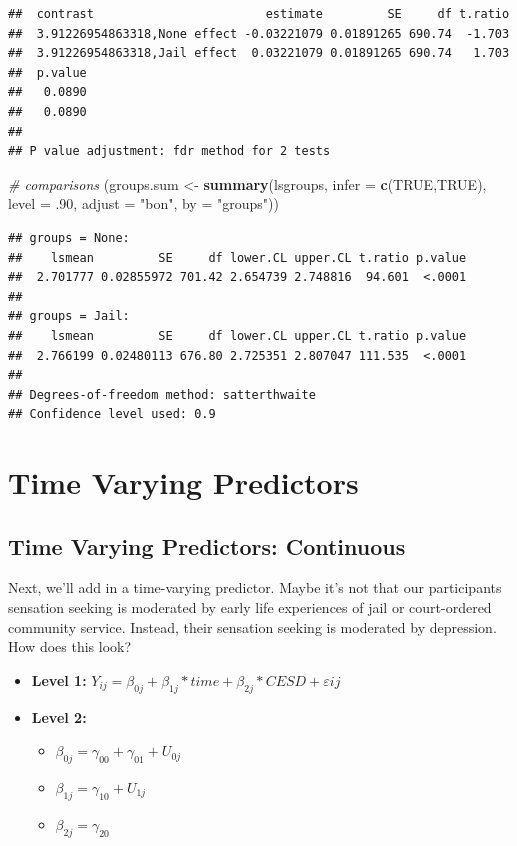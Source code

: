 \documentclass[]{article}
\newenvironment{Shaded}{\begin{snugshade}}{\end{snugshade}}
\newcommand{\KeywordTok}[1]{\textcolor[rgb]{0.13,0.29,0.53}{\textbf{{#1}}}}
\newcommand{\DataTypeTok}[1]{\textcolor[rgb]{0.13,0.29,0.53}{{#1}}}
\newcommand{\DecValTok}[1]{\textcolor[rgb]{0.00,0.00,0.81}{{#1}}}
\newcommand{\StringTok}[1]{\textcolor[rgb]{0.31,0.60,0.02}{{#1}}}
\newcommand{\CommentTok}[1]{\textcolor[rgb]{0.56,0.35,0.01}{\textit{{#1}}}}
\newcommand{\OtherTok}[1]{\textcolor[rgb]{0.56,0.35,0.01}{{#1}}}
\newcommand{\NormalTok}[1]{{#1}}
\begin{document}
\begin{verbatim}
##  contrast                        estimate         SE     df t.ratio
##  3.91226954863318,None effect -0.03221079 0.01891265 690.74  -1.703
##  3.91226954863318,Jail effect  0.03221079 0.01891265 690.74   1.703
##  p.value
##   0.0890
##   0.0890
## 
## P value adjustment: fdr method for 2 tests
\end{verbatim}

\begin{Shaded}
\begin{Highlighting}[]
\CommentTok{# comparisons}
\NormalTok{(groups.sum <-}\StringTok{ }\KeywordTok{summary}\NormalTok{(lsgroups, }\DataTypeTok{infer =} \KeywordTok{c}\NormalTok{(}\OtherTok{TRUE}\NormalTok{,}\OtherTok{TRUE}\NormalTok{), }
          \DataTypeTok{level =} \NormalTok{.}\DecValTok{90}\NormalTok{, }\DataTypeTok{adjust =} \StringTok{"bon"}\NormalTok{, }\DataTypeTok{by =} \StringTok{"groups"}\NormalTok{))}
\end{Highlighting}
\end{Shaded}

\begin{verbatim}
## groups = None:
##    lsmean         SE     df lower.CL upper.CL t.ratio p.value
##  2.701777 0.02855972 701.42 2.654739 2.748816  94.601  <.0001
## 
## groups = Jail:
##    lsmean         SE     df lower.CL upper.CL t.ratio p.value
##  2.766199 0.02480113 676.80 2.725351 2.807047 111.535  <.0001
## 
## Degrees-of-freedom method: satterthwaite 
## Confidence level used: 0.9
\end{verbatim}

\section{Time Varying Predictors}\label{time-varying-predictors}

\subsection{Time Varying Predictors:
Continuous}\label{time-varying-predictors-continuous}

Next, we'll add in a time-varying predictor. Maybe it's not that our
participants sensation seeking is moderated by early life experiences of
jail or court-ordered community service. Instead, their sensation
seeking is moderated by depression.\\
How does this look?

\begin{itemize}
  \item \textbf{Level 1:} $Y_{ij} = \beta_{0j} + \beta_{1j}*time + \beta_{2j}*CESD + \varepsilon{ij}$
  \item \textbf{Level 2:} 
    \begin{itemize} 
      \item $\beta_{0j} = \gamma_{00} + \gamma_{01} + U_{0j}$
      \item $\beta_{1j} = \gamma_{10} + U_{1j}$
      \item $\beta_{2j} = \gamma_{20}$
    \end{itemize}
\end{itemize}
\end{document}
